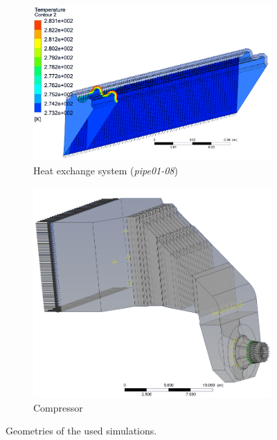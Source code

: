 \documentclass[3p,times]{elsarticle}
\begin{document}
\begin{figure}
\centering
\begin{subfigure}{.4\textwidth}
	\centering
	\includegraphics[width=\linewidth]{pipe_nobg}	
	\caption{Heat exchange system (\textit{pipe01-08})}
 	\label{fig:pipe}
\end{subfigure}
\begin{subfigure}{.5\textwidth}
	\centering
	\includegraphics[width=.7\linewidth]{compressor_nobg}
	\caption{Compressor}
	\label{fig:compressor}
\end{subfigure}

\caption{Geometries of the used simulations.}
\label{fig:geometries}
\end{figure}


\end{document}

